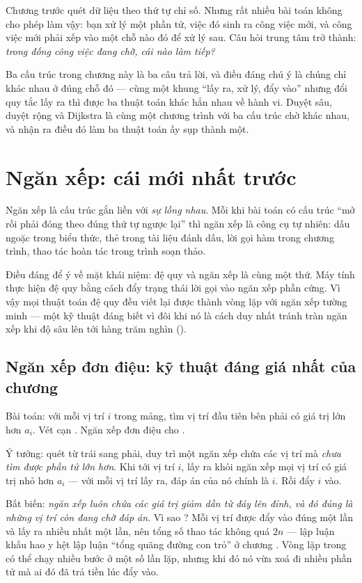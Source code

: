 \documentclass[../../algorithm.tex]{subfiles}
\begin{document}
Chương trước quét dữ liệu theo thứ tự chỉ số. Nhưng rất nhiều bài toán không cho phép làm vậy: bạn xử lý một phần tử, việc đó sinh ra công việc mới, và công việc mới phải xếp vào một chỗ nào đó để xử lý sau. Câu hỏi trung tâm trở thành: \emph{trong đống công việc đang chờ, cái nào làm tiếp?}

Ba cấu trúc trong chương này là ba câu trả lời, và điều đáng chú ý là chúng chỉ khác nhau ở đúng chỗ đó --- cùng một khung ``lấy ra, xử lý, đẩy vào'' nhưng đổi quy tắc lấy ra thì được ba thuật toán khác hẳn nhau về hành vi. Duyệt sâu, duyệt rộng và Dijkstra là cùng một chương trình với ba cấu trúc chờ khác nhau, và nhận ra điều đó làm ba thuật toán ấy sụp thành một.

\section{Ngăn xếp: cái mới nhất trước}

Ngăn xếp là cấu trúc gắn liền với \emph{sự lồng nhau}. Mỗi khi bài toán có cấu trúc ``mở rồi phải đóng theo đúng thứ tự ngược lại'' thì ngăn xếp là công cụ tự nhiên: dấu ngoặc trong biểu thức, thẻ trong tài liệu đánh dấu, lời gọi hàm trong chương trình, thao tác hoàn tác trong trình soạn thảo.

Điều đáng để ý về mặt khái niệm: đệ quy và ngăn xếp là cùng một thứ. Máy tính thực hiện đệ quy bằng cách đẩy trạng thái lời gọi vào ngăn xếp phần cứng. Vì vậy mọi thuật toán đệ quy đều viết lại được thành vòng lặp với ngăn xếp tường minh --- một kỹ thuật đáng biết vì đôi khi nó là cách duy nhất tránh tràn ngăn xếp khi độ sâu lên tới hàng trăm nghìn ().

\subsection{Ngăn xếp đơn điệu: kỹ thuật đáng giá nhất của chương}

Bài toán: với mỗi vị trí \(i\) trong mảng, tìm vị trí đầu tiên bên phải có giá trị lớn hơn \(a_i\). Vét cạn . Ngăn xếp đơn điệu cho .

Ý tưởng: quét từ trái sang phải, duy trì một ngăn xếp chứa các vị trí mà \emph{chưa tìm được phần tử lớn hơn}. Khi tới vị trí \(i\), lấy ra khỏi ngăn xếp mọi vị trí có giá trị nhỏ hơn \(a_i\) --- với mỗi vị trí lấy ra, đáp án của nó chính là \(i\). Rồi đẩy \(i\) vào.

Bất biến: \emph{ngăn xếp luôn chứa các giá trị giảm dần từ đáy lên đỉnh, và đó đúng là những vị trí còn đang chờ đáp án}. Vì sao ? Mỗi vị trí được đẩy vào đúng một lần và lấy ra nhiều nhất một lần, nên tổng số thao tác không quá \(2n\) --- lập luận khấu hao y hệt lập luận ``tổng quãng đường con trỏ'' ở chương . Vòng lặp trong có thể chạy nhiều bước ở một số lần lặp, nhưng khi đó nó vừa xoá đi nhiều phần tử mà ai đó đã trả tiền lúc đẩy vào.
\end{document}
